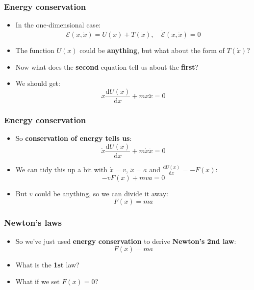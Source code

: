 \documentclass{beamer}
\begin{document}
\begin{frame}
  \frametitle{Energy conservation}
  \begin{itemize}
    \item<1-> In the one-dimensional case:
      \begin{equation*}
      \mathcal{  E}(x,\dot{x})=U(x)+T(\dot{x}), \quad \dot{\mathcal{  E}}(x,\dot{x})=0
      \end{equation*}
    \item<2-> The function $U(x)$ could be \textbf{anything}, but what about the form of $T(\dot{x})$?
    \item<3-> Now what does the \textbf{second} equation tell us about the \textbf{first}?
    \item<4-> We should get:
      \begin{equation*}
	\dot{x}\frac{\mathrm{d}U(x)}{\mathrm{d}x}+m\dot{x}\ddot{x}=0
      \end{equation*}
  \end{itemize}
\end{frame}

\begin{frame}
  \frametitle{Energy conservation}
  \begin{itemize}
    \item<1-> So \textbf{conservation of energy tells us}:
      \begin{equation*}
	\dot{x}\frac{\mathrm{d}U(x)}{\mathrm{d}x}+m\dot{x}\ddot{x}=0
      \end{equation*}
    \item<2-> We can tidy this up a bit with $\dot{x}=v$, $\ddot{x}=a$ and $\frac{\mathrm{d}U(x)}{\mathrm{d}x}=-F(x)$:
      \begin{equation*}
	-vF(x)+mva=0
      \end{equation*}
    \item<3-> But $v$ could be anything, so we can divide it away:
      \begin{equation*}
	F(x)=ma
      \end{equation*}
  \end{itemize}
\end{frame}

\begin{frame}
  \frametitle{Newton's laws}
  \begin{itemize}
    \item<1-> So we've just used \textbf{energy conservation} to derive \textbf{Newton's 2nd law}:
      \begin{equation*}
	F(x)=ma
      \end{equation*}
    \item<2-> What is the \textbf{1st} law?
    \item<3-> What if we set $F(x)=0$?
  \end{itemize}
\end{frame}
\end{document}
